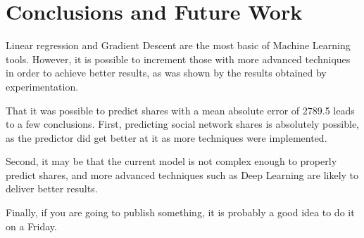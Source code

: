 \documentclass[10pt,twocolumn,letterpaper]{article}
\begin{document}
\section{Conclusions and Future Work}
Linear regression and Gradient Descent are the most basic of Machine Learning tools. However, it is possible to increment those with more advanced techniques in order to achieve better results, as was shown by the results obtained by experimentation. 

That it was possible to predict shares with a mean absolute error of 2789.5 leads to a few conclusions. First, predicting social network shares is absolutely possible, as the predictor did get better at it as more techniques were implemented. 

Second, it may be that the current model is not complex enough to properly predict shares, and more advanced techniques such as Deep Learning are likely to deliver better results. 

Finally, if you are going to publish something, it is probably a good idea to do it on a Friday.
{\small


}
\end{document}
